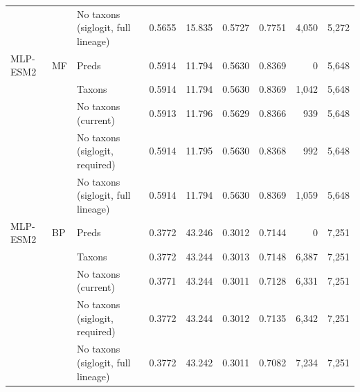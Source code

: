 \begin{tabular}{lllrrrrrr}
 &  & No taxons (siglogit, full lineage) & 0.5655 & 15.835 & 0.5727 & 0.7751 & 4{,}050 & 5{,}272 \\
\addlinespace
MLP-ESM2 & MF & Preds & 0.5914 & 11.794 & 0.5630 & 0.8369 & 0 & 5{,}648 \\
 &  & Taxons & 0.5914 & 11.794 & 0.5630 & 0.8369 & 1{,}042 & 5{,}648 \\
 &  & No taxons (current) & 0.5913 & 11.796 & 0.5629 & 0.8366 & 939 & 5{,}648 \\
 &  & No taxons (siglogit, required) & 0.5914 & 11.795 & 0.5630 & 0.8368 & 992 & 5{,}648 \\
 &  & No taxons (siglogit, full lineage) & 0.5914 & 11.794 & 0.5630 & 0.8369 & 1{,}059 & 5{,}648 \\
\addlinespace
MLP-ESM2 & BP & Preds & 0.3772 & 43.246 & 0.3012 & 0.7144 & 0 & 7{,}251 \\
 &  & Taxons & 0.3772 & 43.244 & 0.3013 & 0.7148 & 6{,}387 & 7{,}251 \\
 &  & No taxons (current) & 0.3771 & 43.244 & 0.3011 & 0.7128 & 6{,}331 & 7{,}251 \\
 &  & No taxons (siglogit, required) & 0.3772 & 43.244 & 0.3012 & 0.7135 & 6{,}342 & 7{,}251 \\
 &  & No taxons (siglogit, full lineage) & 0.3772 & 43.242 & 0.3011 & 0.7082 & 7{,}234 & 7{,}251 \\
\bottomrule
\end{tabular}
